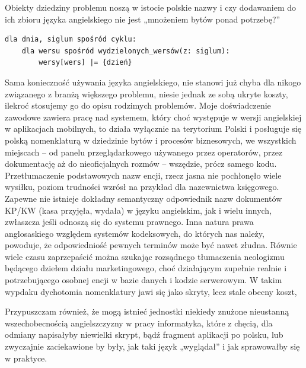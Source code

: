 Obiekty dziedziny problemu noszą w istocie polskie nazwy i czy dodawaniem do ich zbioru języka angielskiego nie jest „mnożeniem bytów ponad potrzebę?”
\begin{lstlisting}
dla dnia, siglum spośród cyklu:
	dla wersu spośród wydzielonych_wersów(z: siglum):
		wersy[wers] |= {dzień}
\end{lstlisting}
Sama konieczność używania języka angielskiego, nie stanowi już chyba dla nikogo związanego z branżą większego problemu, niesie jednak ze sobą ukryte koszty, ilekroć stosujemy go do opisu rodzimych problemów. Moje doświadczenie zawodowe zawiera pracę nad systemem, który choć występuje w wersji angielskiej w aplikacjach mobilnych, to działa wyłącznie na terytorium Polski i posługuje się polską nomenklaturą w dziedzinie bytów i procesów biznesowych, we wszystkich miejscach – od panelu przeglądarkowego używanego przez operatorów, przez dokumentację aż do nieoficjalnych rozmów – wszędzie, prócz samego kodu. Przetłumaczenie podstawowych nazw encji, rzecz jasna nie pochłonęło wiele wysiłku, poziom trudności wzrósł na przykład dla nazewnictwa księgowego. Zapewne nie istnieje dokładny semantyczny odpowiednik nazw dokumentów KP/KW (kasa przyjęła, wydała) w języku angielskim, jak i wielu innych, zwłaszcza jeśli odnoszą się do systemu prawnego. Inna natura prawa anglosaskiego względem systemów kodeksowych, do których nas należy, powoduje, że odpowiedniość pewnych terminów może być nawet złudna. Równie wiele czasu zaprzepaścić można szukając rozsądnego tłumaczenia neologizmu będącego dziełem działu marketingowego, choć działającym zupełnie realnie i potrzebującego osobnej encji w bazie danych i kodzie serwerowym. W takim wypdaku dychotomia nomenklatury jawi się jako skryty, lecz stale obecny koszt, 

Przypuszczam również, że mogą istnieć jednostki niekiedy znużone nieustanną wszechobecnością angielszczyzny w pracy informatyka, które z chęcią, dla odmiany napisałyby niewielki skrypt, bądź fragment aplikacji po polsku, lub zwyczajnie zaciekawione by były, jak taki język „wyglądał” i jak sprawowałby się w praktyce.

